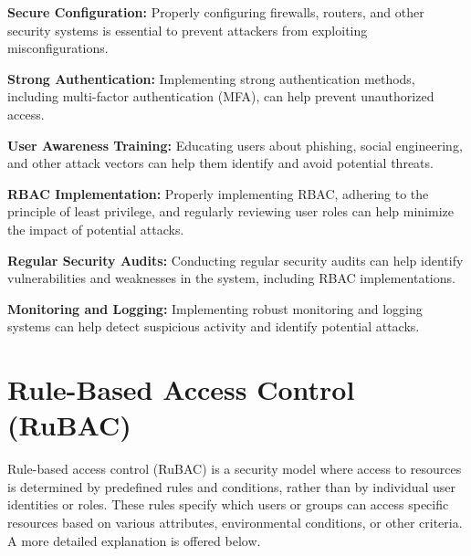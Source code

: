 \textbf{Secure Configuration:}
Properly configuring firewalls, routers, and other security systems is essential to prevent attackers from exploiting misconfigurations. 
    
\textbf{Strong Authentication:}
Implementing strong authentication methods, including multi-factor authentication (MFA), can help prevent unauthorized access. 
    
\textbf{User Awareness Training:}
Educating users about phishing, social engineering, and other attack vectors can help them identify and avoid potential threats. 

\textbf{RBAC Implementation:}
Properly implementing RBAC, adhering to the principle of least privilege, and regularly reviewing user roles can help minimize the impact of potential attacks. 

\textbf{Regular Security Audits:}
Conducting regular security audits can help identify vulnerabilities and weaknesses in the system, including RBAC implementations. 

\textbf{Monitoring and Logging:}
Implementing robust monitoring and logging systems can help detect suspicious activity and identify potential attacks. 

\section{Rule-Based Access Control (RuBAC)}
Rule-based access control (RuBAC) is a security model where access to resources is determined by predefined rules and conditions, rather than by individual user identities or roles. These rules specify which users or groups can access specific resources based on various attributes, environmental conditions, or other criteria. A more detailed explanation is offered below.

